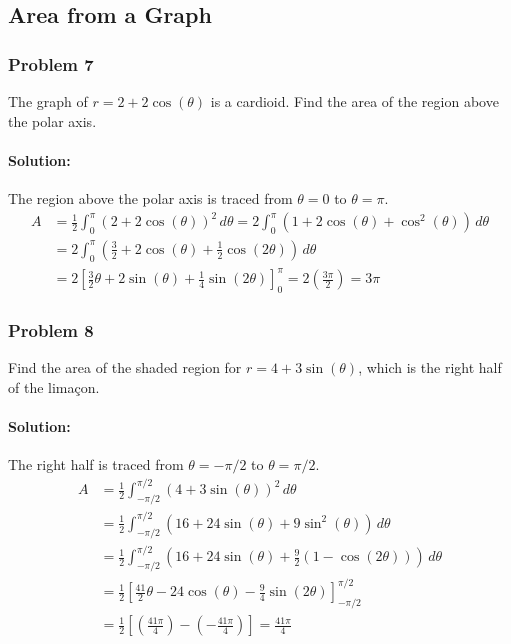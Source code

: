 \documentclass{article}
\begin{document}

\subsection*{Area from a Graph}

\subsubsection*{Problem 7}
The graph of $r = 2 + 2\cos(\theta)$ is a cardioid. Find the area of the region above the polar axis.
\paragraph{Solution:}
The region above the polar axis is traced from $\theta = 0$ to $\theta = \pi$.
\begin{align*} A &= \frac{1}{2} \int_{0}^{\pi} (2 + 2\cos(\theta))^2 \,d\theta = 2 \int_{0}^{\pi} (1 + 2\cos(\theta) + \cos^2(\theta)) \,d\theta \\ &= 2 \int_{0}^{\pi} \left(\frac{3}{2} + 2\cos(\theta) + \frac{1}{2}\cos(2\theta)\right) \,d\theta \\ &= 2 \left[\frac{3}{2}\theta + 2\sin(\theta) + \frac{1}{4}\sin(2\theta)\right]_{0}^{\pi} = 2 \left(\frac{3\pi}{2}\right) = 3\pi \end{align*}

\subsubsection*{Problem 8}
Find the area of the shaded region for $r=4+3\sin(\theta)$, which is the right half of the limaçon.
\paragraph{Solution:}
The right half is traced from $\theta = -\pi/2$ to $\theta = \pi/2$.
\begin{align*} A &= \frac{1}{2} \int_{-\pi/2}^{\pi/2} (4 + 3\sin(\theta))^2 \,d\theta \\ &= \frac{1}{2} \int_{-\pi/2}^{\pi/2} (16 + 24\sin(\theta) + 9\sin^2(\theta)) \,d\theta \\ &= \frac{1}{2} \int_{-\pi/2}^{\pi/2} \left(16 + 24\sin(\theta) + \frac{9}{2}(1 - \cos(2\theta))\right) \,d\theta \\ &= \frac{1}{2} \left[\frac{41}{2}\theta - 24\cos(\theta) - \frac{9}{4}\sin(2\theta)\right]_{-\pi/2}^{\pi/2} \\ &= \frac{1}{2} \left[ \left(\frac{41\pi}{4}\right) - \left(-\frac{41\pi}{4}\right) \right] = \frac{41\pi}{4} \end{align*}
\end{document}
